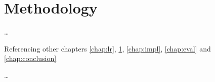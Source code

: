 \chapter{Methodology}
\label{chap:met}


\ldots

Referencing other chapters \ref{chap:lr}, \ref{chap:met}, \ref{chap:impl}, \ref{chap:eval} and \ref{chap:conclusion}

\ldots